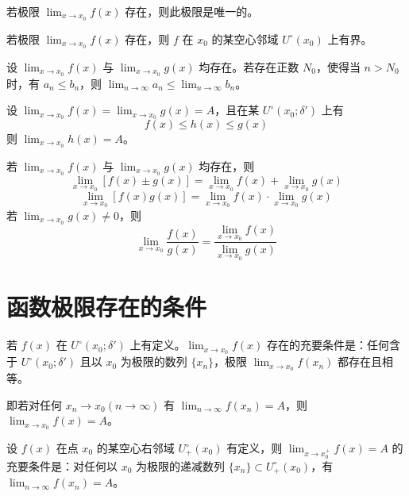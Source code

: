 \begin{theorem}[唯一性]
    若极限 $\displaystyle\lim_{x\to x_0}f(x)$ 存在，则此极限是唯一的。
\end{theorem}

\begin{theorem}[局部有界性]
    若极限 $\displaystyle\lim_{x\to x_0}f(x)$ 存在，则 $f$ 在 $x_0$ 的某空心邻域 $U^\circ(x_0)$ 上有界。
\end{theorem}

\begin{theorem}[保不等式性]
    设 $\lim_{x\to x_0}f(x)$ 与 $\lim_{x\to x_0}g(x)$ 均存在。若存在正数 $N_0$，使得当 $n>N_0$ 时，有 $a_n\leqslant b_n$，则 $\displaystyle\lim_{n\to \infty}a_n \leqslant \lim_{n\to \infty}b_n$。
\end{theorem}

\begin{theorem}[迫敛性]
    设 $\displaystyle\lim_{x\to x_0}f(x) = \lim_{x\to x_0}g(x) = A$，且在某 $U^\circ(x_0;\delta')$ 上有
    $$f(x)\leqslant h(x) \leqslant g(x)$$
    则 $\lim_{x\to x_0}h(x) = A$。
\end{theorem}

\begin{theorem}[四则运算法则]
    若 $\displaystyle\lim_{x\to x_0}f(x)$ 与 $\displaystyle\lim_{x\to x_0}g(x)$ 均存在，则
    $$\lim_{x\to x_0}[f(x)\pm g(x)] = \lim_{x\to x_0}f(x) + \lim_{x\to x_0}g(x)$$
    $$\lim_{x\to x_0}[f(x)g(x)] = \lim_{x\to x_0}f(x) \cdot \lim_{x\to x_0}g(x)$$
    若 $\displaystyle\lim_{x\to x_0}g(x)\ne 0$，则
    $$\lim_{x\to x_0}\frac{f(x)}{g(x)} = \frac{\lim_{x\to x_0}f(x)}{\lim_{x\to x_0}g(x)}$$
\end{theorem}

\section{函数极限存在的条件}

\begin{theorem}
    若 $f(x)$ 在 $U^\circ(x_0;\delta')$ 上有定义。$\displaystyle\lim_{x\to x_0}f(x)$ 存在的充要条件是：任何含于 $U^\circ(x_0;\delta')$ 且以 $x_0$ 为极限的数列 $\{x_n\}$，极限 $\displaystyle\lim_{x\to x_0}f(x_n)$ 都存在且相等。
\end{theorem}

即若对任何 $x_n\to x_0(n\to \infty)$ 有 $\displaystyle\lim_{n\to \infty}f(x_n) = A$，则 $\displaystyle\lim_{x\to x_0}f(x)=A$。

\begin{theorem}
    设 $f(x)$ 在点 $x_0$ 的某空心右邻域 $U_+^\circ(x_0)$ 有定义，则 $\displaystyle\lim_{x\to x_0^+}f(x)=A$ 的充要条件是：对任何以 $x_0$ 为极限的递减数列 $\{x_n\}\subset U_+^\circ(x_0)$，有 $\displaystyle\lim_{n\to \infty}f(x_n) = A$。
\end{theorem}

